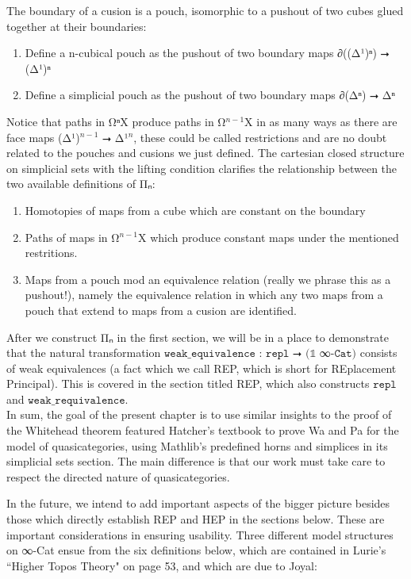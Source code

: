 \documentclass{book}
\theoremstyle{definition}
\begin{document}
The boundary of a cusion is a pouch, isomorphic to a pushout of two cubes glued together at their boundaries:

\begin{enumerate}
\item Define a n-cubical pouch as the pushout of two boundary maps ∂((Δ¹)ⁿ) ⭢ (Δ¹)ⁿ
\item Define a simplicial pouch as the pushout of two boundary maps ∂(Δⁿ) ⭢ Δⁿ
\end{enumerate}

Notice that paths in Ω⃗ⁿX produce paths in Ω⃗${}^{n-1}$X in as many ways as there are face maps (Δ¹)${}^{n-1}$ ⭢ Δ¹${}^{n}$, these could be called restrictions and are no doubt related to the pouches and cusions we just defined. The cartesian closed structure on simplicial sets with the lifting condition clarifies the relationship between the two available definitions of Π⃗ₙ:

\begin{enumerate}
\item Homotopies of maps from a cube which are constant on the boundary
\item Paths of maps in Ω⃗${}^{n-1}$X which produce constant maps under the mentioned restritions.
\item Maps from a pouch mod an equivalence relation (really we phrase this as a pushout!), namely the equivalence relation in which any two maps from a pouch that extend to maps from a cusion are identified.
\end{enumerate}

After we construct Π⃗ₙ in the first section, we will be in a place to demonstrate that the natural transformation $\texttt{weak\_equivalence : repl ⭢ (𝟙 }$∞$\texttt{-Cat)}$ consists of weak equivalences (a fact which we call REP, which is short for REplacement Principal). This is covered in the section titled REP, which also constructs $\texttt{repl}$ and $\texttt{weak\_requivalence}$.\\

In sum, the goal of the present chapter is to use similar insights to the proof of the Whitehead theorem featured Hatcher's textbook to prove Wa and Pa for the model of quasicategories, using Mathlib's predefined horns and simplices in its simplicial sets section. The main difference is that our work must take care to respect the directed nature of quasicategories.\\
\fi

\iffalse
In the future, we intend to add important aspects of the bigger picture besides those which directly establish REP and HEP in the sections below. These are important considerations in ensuring usability. Three different model structures on ∞-Cat ensue from the six definitions below, which are contained in Lurie's ``Higher Topos Theory" on page 53, and which are due to Joyal:
\end{document}
